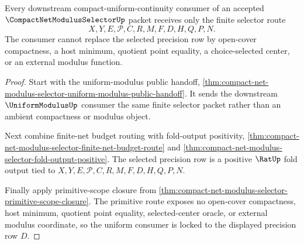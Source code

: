 \begin{theorem}
\label{thm:compact-net-modulus-selector-uniform-consumer-precision-lock}
Every downstream compact-uniform-continuity consumer of an accepted $\CompactNetModulusSelectorUp$ packet receives only the finite selector route
$$
X,Y,E,\mathcal{P},C,R,M,F,D,H,Q,P,N.
$$
The consumer cannot replace the selected precision row by open-cover compactness, a host minimum, quotient point equality, a choice-selected center, or an external modulus function.
\end{theorem}
\begin{proof}
Start with the uniform-modulus public handoff, \autoref{thm:compact-net-modulus-selector-uniform-modulus-public-handoff}. It sends the downstream $\UniformModulusUp$ consumer the same finite selector packet rather than an ambient compactness or modulus object.

Next combine finite-net budget routing with fold-output positivity, \autoref{thm:compact-net-modulus-selector-finite-net-budget-route} and \autoref{thm:compact-net-modulus-selector-fold-output-positive}. The selected precision row is a positive $\RatUp$ fold output tied to $X,Y,E,\mathcal{P},C,R,M,F,D,H,Q,P,N$.

Finally apply primitive-scope closure from \autoref{thm:compact-net-modulus-selector-primitive-scope-closure}. The primitive route exposes no open-cover compactness, host minimum, quotient point equality, selected-center oracle, or external modulus coordinate, so the uniform consumer is locked to the displayed precision row $D$.
\end{proof}

